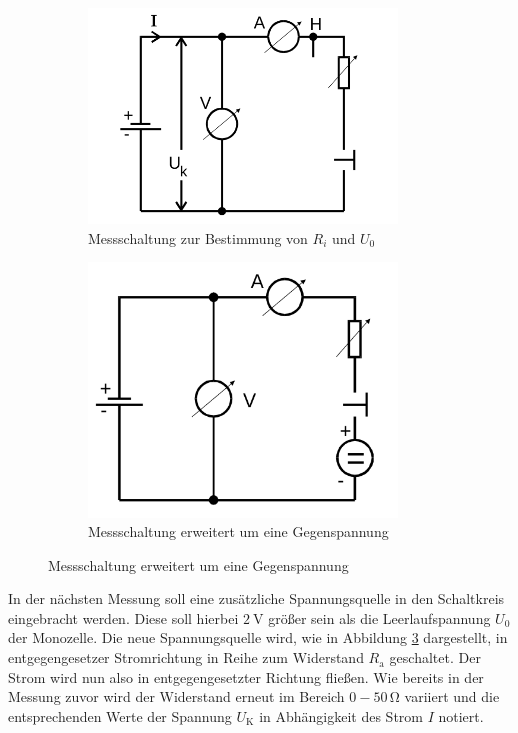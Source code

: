\begin{figure}[h]
\centering
\begin{subfigure}{0.53\textwidth}
\centering
\includegraphics[width=0.9\textwidth]{Bilder/Abbildung2.png}
\caption{Messschaltung zur Bestimmung von $R_i$ und $U_0$ \cite{Anleitung}}
\label{fig:abbildung2}
\end{subfigure}
\begin{subfigure}{0.45\textwidth}
\centering
\includegraphics[width=0.9\textwidth]{Bilder/Abbildung3.png}
\caption{Messschaltung  erweitert um eine Gegenspannung \cite{Anleitung}}
\label{fig:abbildung3}
\end{subfigure}
\end{figure}
In der nächsten Messung soll eine zusätzliche Spannungsquelle in den Schaltkreis eingebracht werden.
Diese soll hierbei $\SI{2}{\volt}$ größer sein als die Leerlaufspannung $U_0$ der Monozelle.
Die neue Spannungsquelle wird, wie in Abbildung \ref{fig:abbildung3} dargestellt, in entgegengesetzer Stromrichtung in Reihe zum Widerstand $R_{\text{a}}$ geschaltet.
Der Strom wird nun also in entgegengesetzter Richtung fließen. Wie bereits in der Messung zuvor wird der Widerstand erneut im Bereich $0-50 \, \si{\ohm}$ variiert und die entsprechenden Werte der Spannung $U_{\text{K}}$ in Abhängigkeit des Strom $I$ notiert.

